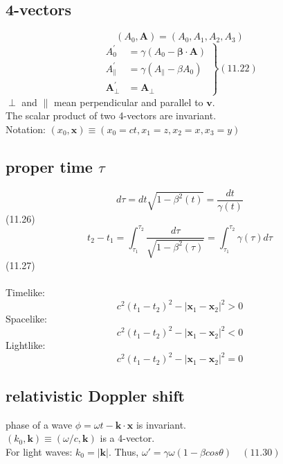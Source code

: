 \documentclass[10pt, oneside]{article}   	%
\begin{document}
\begin{multicols}{2}
\subsection{4-vectors}
$$(A_0,\boldsymbol{A})=(A_0, A_1, A_2, A_3)$$
$$
\left.\begin{array}{rl}
A_{0}^{\prime} & =\gamma\left(A_{0}-\boldsymbol{\beta} \cdot \mathbf{A}\right) \\ A_{\|}^{\prime} & =\gamma\left(A_{\|}-\beta A_{0}\right) \\ 
\mathbf{A}_{\perp}^{\prime} & =\mathbf{A}_{\perp}
\end{array}\right\}(11.22)
$$
$\perp$ and $\|$ mean perpendicular and parallel to $\boldsymbol{v}$.\\
The scalar product of two 4-vectors are invariant.\\
Notation: $(x_0, \boldsymbol{x})\equiv (x_0=c t, x_1=z, x_2=x, x_3=y)$

\subsection{proper time $\tau$}
$$d \tau=d t \sqrt{1-\beta^{2}(t)}=\frac{d t}{\gamma(t)}$$
(11.26)\\
$$t_{2}-t_{1}=\int_{\tau_{1}}^{\tau_{2}} \frac{d \tau}{\sqrt{1-\beta^{2}(\tau)}}=\int_{\tau_{1}}^{\tau_{2}} \gamma(\tau) d \tau$$
(11.27)\\
\\
Timelike:\\
$$c^{2}\left(t_{1}-t_{2}\right)^{2}-\left|\mathbf{x}_{1}-\mathbf{x}_{2}\right|^{2}>0$$
Spacelike:\\
$$c^{2}\left(t_{1}-t_{2}\right)^{2}-\left|\mathbf{x}_{1}-\mathbf{x}_{2}\right|^{2}<0$$
Lightlike:\\
$$c^{2}\left(t_{1}-t_{2}\right)^{2}-\left|\mathbf{x}_{1}-\mathbf{x}_{2}\right|^{2}=0$$

\subsection{relativistic Doppler shift}
phase of a wave $\phi=\omega t - \boldsymbol{k} \cdot \boldsymbol{x}$ is invariant.\\
$(k_0, \boldsymbol{k})\equiv(\omega/c, \boldsymbol{k})$ is a 4-vector.\\
For light waves: $k_0=|\boldsymbol{k}|$. Thus, $\omega'=\gamma\omega(1-\beta cos\theta)\quad(11.30)$


\end{multicols}
\end{document}
